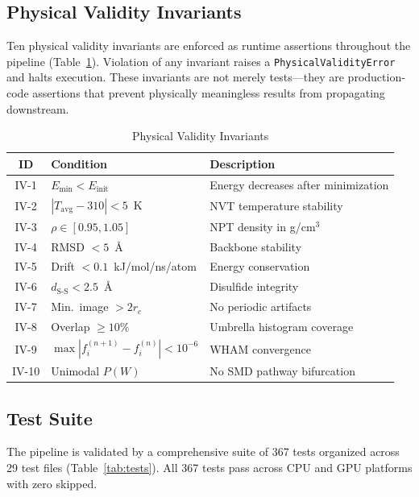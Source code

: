 \documentclass[conference]{IEEEtran}
\begin{document}
\subsection{Physical Validity Invariants}

Ten physical validity invariants are enforced as runtime assertions
throughout the pipeline (Table~\ref{tab:invariants}).  Violation of any
invariant raises a \texttt{PhysicalValidityError} and halts execution.
These invariants are not merely tests---they are production-code assertions
that prevent physically meaningless results from propagating downstream.

\begin{table}[H]
  \centering
  \caption{Physical Validity Invariants}
  \label{tab:invariants}
  \begin{tabular}{@{}clp{3.8cm}@{}}
    \toprule
    \textbf{ID} & \textbf{Condition} & \textbf{Description} \\
    \midrule
    IV-1 & $E_{\min} < E_{\mathrm{init}}$ & Energy decreases after minimization \\
    IV-2 & $|T_{\mathrm{avg}} - 310| < 5$~K & NVT temperature stability \\
    IV-3 & $\rho \in [0.95, 1.05]$ & NPT density in g/cm$^3$ \\
    IV-4 & RMSD $< 5$~\AA & Backbone stability \\
    IV-5 & Drift $< 0.1$~kJ/mol/ns/atom & Energy conservation \\
    IV-6 & $d_{\mathrm{S\text{-}S}} < 2.5$~\AA & Disulfide integrity \\
    IV-7 & Min.\ image $> 2r_c$ & No periodic artifacts \\
    IV-8 & Overlap $\geq 10\%$ & Umbrella histogram coverage \\
    IV-9 & $\max |f_i^{(n+1)} - f_i^{(n)}| < 10^{-6}$ & WHAM convergence \\
    IV-10 & Unimodal $P(W)$ & No SMD pathway bifurcation \\
    \bottomrule
  \end{tabular}
\end{table}

\subsection{Test Suite}

The pipeline is validated by a comprehensive suite of 367 tests organized
across 29 test files (Table~\ref{tab:tests}).  All 367 tests pass across
CPU and GPU platforms with zero skipped.
\end{document}
